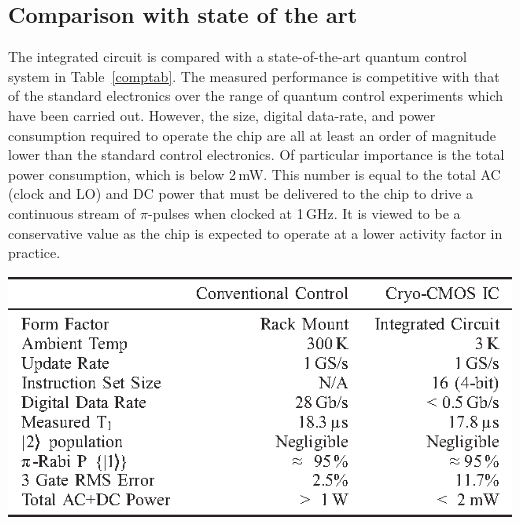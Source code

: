 \documentclass[journal]{IEEEtran}
\newcommand{\CR}[1]{{\color{black}#1}}
\begin{document}
\subsection{Comparison with state of the art}
The integrated circuit is compared with a state-of-the-art quantum control system in Table~\ref{comptab}. The measured performance is competitive with that of the standard electronics \CR{over the range of quantum control experiments which have been carried out}. However, the size, digital data-rate, and power consumption required to operate the chip are all at least an order of magnitude lower than the standard \CR{control} electronics. Of particular importance is the total power consumption, which is below 2\,mW. This number is equal to the total AC \CR{(clock and LO)} and DC power that must be delivered to the chip to drive a continuous stream of $\pi$-pulses when clocked at 1\,GHz. It is viewed to be a conservative value as the chip is expected to operate at a lower activity factor in practice. 
\begin{table}[bt!]
\caption{Comparison of CMOS IC @$f_\text{CLK}=1\,$GHz to State-of-the-art quantum control system }\label{comptab}
\centering
\includegraphics[width=0.92\columnwidth]{Figures/table_2}
\end{table}
\end{document}
